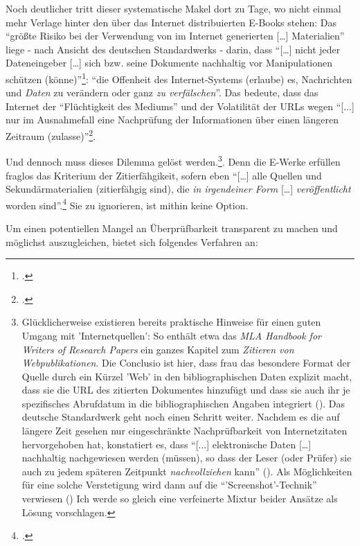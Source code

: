 Noch deutlicher tritt dieser systematische Makel dort zu Tage, wo nicht einmal mehr Verlage hinter den über das Internet distribuierten E-Books stehen: Das \enquote{größte Risiko bei der Verwendung von im Internet generierten [\ldots] Materialien} liege - nach Ansicht des deutschen Standardwerks - darin, dass \enquote{[\ldots] nicht jeder Dateneingeber [\ldots] sich bzw. seine Dokumente nachhaltig vor Manipulationen schützen (könne)}\footcite[vgl.][85]{Theisen2013a}: \enquote{die Offenheit des Internet-Systems (erlaube) es, Nachrichten und \emph{Daten} zu verändern oder ganz \emph{zu verfälschen}}. Das bedeute, dass das Internet der \enquote{Flüchtigkeit des Mediums} und der Volatilität der URLs wegen \enquote{[...] nur im Ausnahmefall eine Nachprüfung der Informationen über einen längeren Zeitraum (zulasse)}\footcite[vgl.][S. 86f (herv.i.O)]{Theisen2013a}.

Und dennoch muss dieses Dilemma gelöst werden.\footnote{Glücklicherweise existieren bereits praktische Hinweise für einen guten Umgang mit 'Internetquellen': So enthält etwa das \emph{MLA Handbook for Writers of Research Papers} ein ganzes Kapitel zum \emph{Zitieren von Webpublikationen}. Die Conclusio ist hier, dass frau das besondere Format der Quelle durch ein Kürzel 'Web' in den bibliographischen Daten explizit macht, dass sie die URL des
zitierten Dokumentes hinzufügt und dass sie auch ihr je spezifisches Abrufdatum
in die bibliographischen Angaben integriert (\cite[vgl.][S. 28ff u. 181ff]{ModLanAss2009a}). Das deutsche Standardwerk geht noch einen Schritt weiter. Nachdem es die auf längere Zeit gesehen nur eingeschränkte Nachprüfbarkeit von Internetzitaten hervorgehoben hat, konstatiert es, dass \enquote{[...] elektronische Daten [\ldots] nachhaltig nachgewiesen werden (müssen), so dass der Leser (oder Prüfer) sie auch zu jedem späteren Zeitpunkt \emph{nachvollziehen} kann} (\cite[vgl.][S. 86f]{Theisen2013a}). Als Möglichkeiten für eine solche Verstetigung wird dann auf die \enquote{'Screenshot'-Technik} verwiesen (\cite[vgl.][80 u. 87]{Theisen2013a}) Ich werde so gleich eine verfeinerte Mixtur beider Ansätze als Lösung vorschlagen.}. Denn die E-Werke erfüllen fraglos das Kriterium der Zitierfähgikeit, sofern eben \enquote{[\ldots] alle Quellen und Sekundärmaterialien (zitierfähgig sind), die \emph{in irgendeiner Form} [\ldots] \emph{veröffentlicht} worden sind}.\footcite[vgl.][S. 160 (herv. K.R)]{Theisen2013a} Sie zu ignorieren, ist mithin keine Option.

Um einen potentiellen Mangel an Überprüfbarkeit transparent zu machen und
möglichst auszugleichen, bietet sich folgendes Verfahren an:

